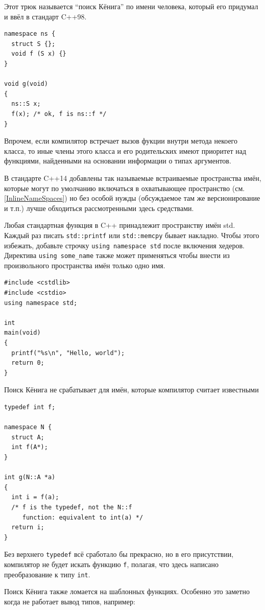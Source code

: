 \documentclass[a4paper,12pt,oneside]{article}
\begin{document}
Этот трюк называется ``поиск Кёнига'' по имени человека, который его придумал и ввёл в стандарт C++98.

\begin{lstlisting}
namespace ns {
  struct S {};
  void f (S x) {}
}

void g(void)
{
  ns::S x;
  f(x); /* ok, f is ns::f */
}
\end{lstlisting}

Впрочем, если компилятор встречает вызов фукции внутри метода некоего класса, то иные члены этого класса и его родительских имеют приоритет над функциями, найденными на основании информации о типах аргументов.

В стандарте C++14 добавлены так называемые встраиваемые пространства имён, которые могут по умолчанию включаться в охватывающее пространство (см. \ref{InlineNameSpaces}) но без особой нужды (обсуждаемое там же версионирование и т.п.) лучше обходиться рассмотренными здесь средствами.

Любая стандартная функция в C++ принадлежит пространству имён std. Каждый раз писать \lstinline!std::printf! или \lstinline!std::memcpy! бывает накладно. Чтобы этого избежать, добавьте строчку \lstinline!using namespace std! после включения хедеров. Директива \lstinline!using some_name! также может применяться чтобы внести из произвольного пространства имён только одно имя.

\begin{lstlisting}
#include <cstdlib>
#include <cstdio>
using namespace std;

int 
main(void)
{
  printf("%s\n", "Hello, world");
  return 0;
}
\end{lstlisting}

Поиск Кёнига не срабатывает для имён, которые компилятор считает известными

\begin{lstlisting}
typedef int f;

namespace N {
  struct A;
  int f(A*);
}

int g(N::A *a)
{
  int i = f(a);
  /* f is the typedef, not the N::f
     function: equivalent to int(a) */
  return i;
}
\end{lstlisting}

Без верхнего \lstinline!typedef! всё сработало бы прекрасно, но в его присутствии, компилятор не будет искать функцию \lstinline!f!, полагая, что здесь написано преобразование к типу \lstinline!int!.

Поиск Кёнига также ломается на шаблонных функциях. Особенно это заметно когда не работает вывод типов, например:
\end{document}
